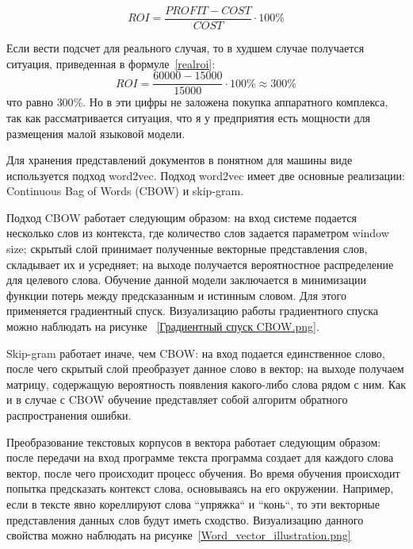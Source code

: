 \begin{equation} \label{roi}
    ROI = \frac{PROFIT - COST}{COST} \cdot 100\%
\end{equation}

Если вести подсчет для реального случая, то в худшем случае получается ситуация,
приведенная в формуле~\ref{realroi}:
\begin{equation} \label{realroi}
    ROI = \frac{60000 - 15000}{15000} \cdot 100\% \approx 300\%
\end{equation}
что равно $300\%$. Но в эти цифры не заложена покупка аппаратного комплекса, 
так как рассматривается ситуация, что я у предприятия есть мощности для 
размещения малой языковой модели.


Для хранения представлений документов в понятном для машины виде используется
подход word2vec.
Подход word2vec имеет две основные реализации: Continuous Bag of Words (CBOW)
и skip-gram.

Подход CBOW работает следующим образом: на вход системе подается несколько слов
из контекста, где количество слов задается параметром window size; скрытый слой
принимает полученные векторные представления слов, складывает их и усредняет;
на выходе получается вероятностное распределение для целевого слова.
Обучение данной модели заключается в минимизации функции потерь между
предсказанным и истинным словом. Для этого применяется градиентный спуск.
Визуализацию работы градиентного спуска можно наблюдать на рисунке
~\ref{Градиентный спуск CBOW.png}.


Skip-gram работает иначе, чем CBOW\@\cite{skip}: на вход подается единственное слово, после
чего скрытый слой преобразует данное слово в вектор; на выходе получаем
матрицу, содержащую вероятность появления какого-либо слова рядом с ним. 
Как и в случае с CBOW обучение представляет собой алгоритм обратного 
распространения ошибки.

Преобразование текстовых корпусов в вектора работает следующим образом:
после передачи на вход программе текста программа создает для каждого слова
вектор, после чего происходит процесс обучения. Во время обучения происходит
попытка предсказать контекст слова, основываясь на его окружении. Например,
если в тексте явно кореллируют слова ``упряжка`` и ``конь``, то эти векторные
представления данных слов будут иметь сходство. Визуализацию данного свойства
можно наблюдать на рисунке~\ref{Word_vector_illustration.png}


